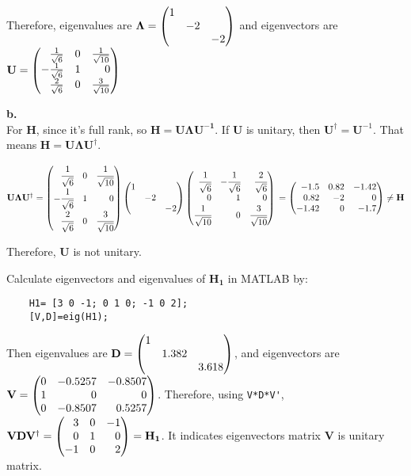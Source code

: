 \documentclass[12pt,a4paper]{article}
\begin{document}
    Therefore, eigenvalues are $\mathbf{\Lambda}=\newvec{1&&\\&-2&\\&&-2}$ and eigenvectors are $\mathbf{U}=\newvec{\frac{1}{\sqrt{6}}&0&\frac{1}{\sqrt{10}}\\-\frac{1}{\sqrt{6}}&1&0\\\frac{2}{\sqrt{6}}&0&\frac{3}{\sqrt{10}}}$

    \textbf{b.}\\
     For $\mathbf{H}$, since it's full rank, so $\mathbf{H=U\Lambda U^{-1}}$. If $\mathbf{U}$ is unitary, then $\mathbf{U}^\dagger = \mathbf{U}^{-1}$. That means $\mathbf{H=U\Lambda U^\dagger}$.
     
     $\mathbf{U\Lambda U^\dagger}=\newvec{\cfrac{1}{\sqrt{6}}&0&\cfrac{1}{\sqrt{10}}\\-\cfrac{1}{\sqrt{6}}&1&0\\\cfrac{2}{\sqrt{6}}&0&\cfrac{3}{\sqrt{10}}}\newvec{1&&\\&-2&\\&&-2}\newvec{\cfrac{1}{\sqrt{6}}&-\cfrac{1}{\sqrt{6}}&\cfrac{2}{\sqrt{6}}\\0&1&0\\\cfrac{1}{\sqrt{10}}&0&\cfrac{3}{\sqrt{10}}}\\
     =\newvec{-1.5&0.82&-1.42\\0.82&-2&0\\-1.42&0&-1.7}\neq \mathbf{H}$

     \noindent Therefore, $\mathbf{U}$ is not unitary. 

     \newpage 

    Calculate eigenvectors and eigenvalues of $\mathbf{H_1}$ in MATLAB by: 
    \begin{lstlisting}
    H1= [3 0 -1; 0 1 0; -1 0 2];
    [V,D]=eig(H1);
    \end{lstlisting}
    Then eigenvalues are $\mathbf{D}=\newvec{1&&\\&1.382&\\&&3.618}$, and eigenvectors are \\
    $\mathbf{V}=\newvec{0&-0.5257&-0.8507\\1&0&0\\0&-0.8507&0.5257}$. Therefore, using \lstinline{V*D*V'}, \\
    $\mathbf{VDV^\dagger}=\newvec{3&0&-1\\0&1&0\\-1&0&2}=\mathbf{H_1}$. It indicates eigenvectors matrix $\mathbf{V}$ is unitary matrix.
\end{document}
